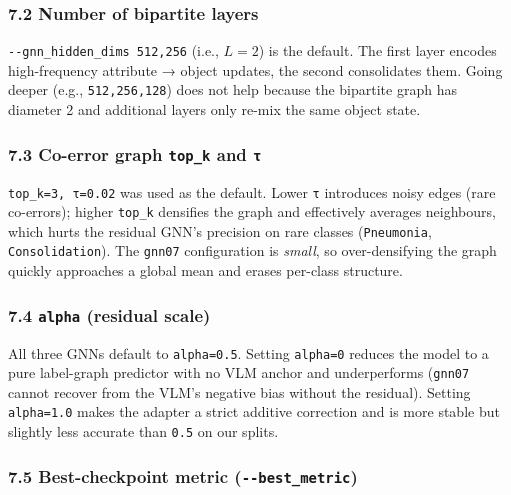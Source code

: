 \documentclass[
  11pt,
]{article}
\begin{document}
\subsubsection{7.2 Number of bipartite
layers}\label{number-of-bipartite-layers}

\texttt{-\/-gnn\_hidden\_dims\ 512,256} (i.e., \(L=2\)) is the default.
The first layer encodes high-frequency attribute → object updates, the
second consolidates them. Going deeper (e.g., \texttt{512,256,128}) does
not help because the bipartite graph has diameter 2 and additional
layers only re-mix the same object state.

\subsubsection{\texorpdfstring{7.3 Co-error graph \texttt{top\_k} and
\texttt{τ}}{7.3 Co-error graph top\_k and τ}}\label{co-error-graph-top_k-and-ux3c4}

\texttt{top\_k=3,\ τ=0.02} was used as the default. Lower \texttt{τ}
introduces noisy edges (rare co-errors); higher \texttt{top\_k}
densifies the graph and effectively averages neighbours, which hurts the
residual GNN's precision on rare classes (\texttt{Pneumonia},
\texttt{Consolidation}). The \texttt{gnn07} configuration is
\emph{small}, so over-densifying the graph quickly approaches a global
mean and erases per-class structure.

\subsubsection{\texorpdfstring{7.4 \texttt{alpha} (residual
scale)}{7.4 alpha (residual scale)}}\label{alpha-residual-scale}

All three GNNs default to \texttt{alpha=0.5}. Setting \texttt{alpha=0}
reduces the model to a pure label-graph predictor with no VLM anchor and
underperforms (\texttt{gnn07} cannot recover from the VLM's negative
bias without the residual). Setting \texttt{alpha=1.0} makes the adapter
a strict additive correction and is more stable but slightly less
accurate than \texttt{0.5} on our splits.

\subsubsection{\texorpdfstring{7.5 Best-checkpoint metric
(\texttt{-\/-best\_metric})}{7.5 Best-checkpoint metric (-\/-best\_metric)}}\label{best-checkpoint-metric---best_metric}
\end{document}
